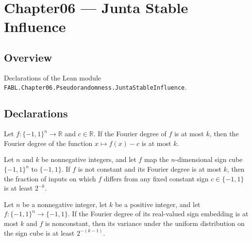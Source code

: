 \chapter{Chapter06 — Junta Stable Influence}
\section{Overview}

Declarations of the Lean module \texttt{FABL.Chapter06.Pseudorandomness.JuntaStableInfluence}.

\section{Declarations}

\begin{theorem}
\label{FABL.fourierDegree_sub_const_le}
\leanok
{}
Let $f:\{-1,1\}^n\to\mathbb{R}$ and $c\in\mathbb{R}$. If the Fourier degree of $f$ is at
most $k$, then the Fourier degree of the function $x\mapsto f(x)-c$ is at most $k$.
\end{theorem}

\begin{theorem}
\label{FABL.inv_two_pow_le_relativeHammingDist_const_of_fourierDegree_le}
\leanok
{}
Let $n$ and $k$ be nonnegative integers, and let $f$ map the $n$-dimensional sign cube
$\{-1,1\}^n$ to $\{-1,1\}$. If $f$ is not constant and its Fourier degree is at most
$k$, then the fraction of inputs on which $f$ differs from any fixed constant sign
$c\in\{-1,1\}$ is at least $2^{-k}$.
\end{theorem}

\begin{theorem}
\label{FABL.inv_two_pow_pred_le_variance_of_fourierDegree_le}
\leanok
{}
Let $n$ be a nonnegative integer, let $k$ be a positive integer, and let
$f:\{-1,1\}^n\to\{-1,1\}$. If the Fourier degree of its real-valued sign embedding
is at most $k$ and $f$ is nonconstant, then its variance under the uniform distribution
on the sign cube is at least $2^{-(k-1)}$.
\end{theorem}

